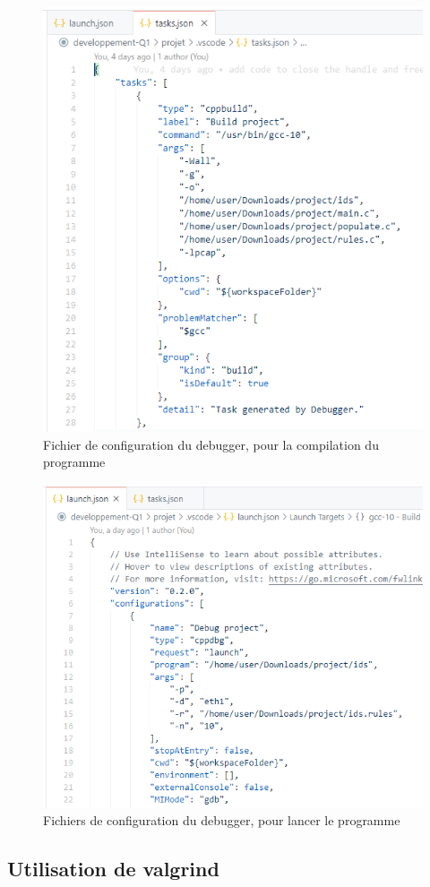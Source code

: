 \documentclass[a4paper]{article}
\begin{document}
\begin{figure}[H]
    \centering
    \includegraphics[width=0.65\linewidth]{images/task-json.PNG}
    \caption{Fichier de configuration du debugger, pour la compilation du programme}
    \label{fig:debugconfig1}
\end{figure}
\begin{figure}[H]
    \centering
    \includegraphics[width=0.70\linewidth]{images/launch-json.PNG}
    \caption{Fichiers de configuration du debugger, pour lancer le programme}
    \label{fig:debugconfig2}
\end{figure}





\subsection{Utilisation de valgrind}
\end{document}
